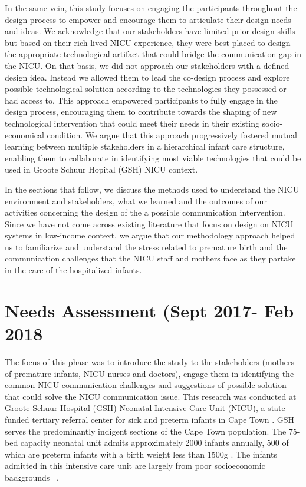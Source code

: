 In the same vein, this study focuses on engaging the participants throughout the design process to empower and encourage them to articulate their design needs and ideas. We acknowledge that our stakeholders have limited prior design skills but based on their rich lived NICU experience, they were best placed to design the appropriate technological artifact that could bridge the communication gap in the NICU. On that basis, we did not approach our stakeholders with a defined design idea. Instead we allowed them to lead the co-design process and explore possible technological solution according to the technologies they possessed or had access to. This approach empowered participants to fully engage in the design process, encouraging them to contribute towards the shaping of new technological intervention that could meet their needs in their existing socio-economical condition. We argue that this approach progressively fostered mutual learning  between multiple stakeholders in a hierarchical infant care structure, enabling them to collaborate in identifying most viable technologies that could be used in Groote Schuur Hopital (GSH) NICU context.

In the sections that follow, we discuss the methods used to understand the NICU environment and stakeholders, what we learned and the outcomes of our activities concerning the design of the a possible communication intervention. Since we have not come across existing literature that focus on design on NICU systems in low-income context, we argue that our methodology approach helped us to familiarize and understand the stress related to premature birth and the communication challenges that the NICU staff and mothers face as they partake in the care of the hospitalized infants.

\section{Needs Assessment (Sept 2017- Feb 2018}
The focus  of this phase was to introduce the study to the stakeholders (mothers of premature infants, NICU nurses and doctors), engage them in identifying the common NICU communication challenges and suggestions of possible solution that could solve the NICU communication issue. This research was conducted at Groote Schuur Hospital (GSH) Neonatal Intensive Care Unit (NICU), a state-funded tertiary referral center for sick and preterm infants in Cape Town \citep{WesternCapeGovernment2014}. GSH serves the predominantly indigent sections of the Cape Town population. The 75-bed capacity neonatal unit admits approximately 2000 infants annually, 500 of which are preterm infants with a birth weight less than 1500g \citep{Kapembwa2017}. The infants admitted in this intensive care unit are largely from poor socioeconomic backgrounds~ \citep{Thompson1993}. 

